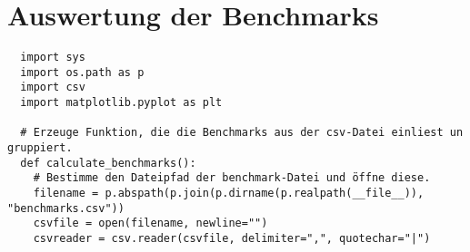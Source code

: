 \section{Auswertung der Benchmarks}
\label{appendix:F:2}

\begin{verbatim}
  import sys
  import os.path as p
  import csv
  import matplotlib.pyplot as plt

  # Erzeuge Funktion, die die Benchmarks aus der csv-Datei einliest un gruppiert.
  def calculate_benchmarks():
    # Bestimme den Dateipfad der benchmark-Datei und öffne diese.
    filename = p.abspath(p.join(p.dirname(p.realpath(__file__)), "benchmarks.csv"))
    csvfile = open(filename, newline="")
    csvreader = csv.reader(csvfile, delimiter=",", quotechar="|")


\end{verbatim}
